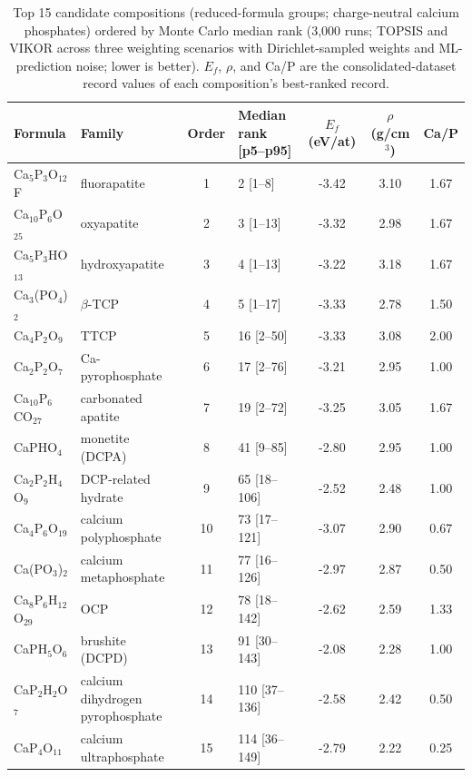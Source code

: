 \documentclass[review,11pt,a4paper]{elsarticle}
\begin{document}
\begin{table}[ht]
\centering\small
\caption{Top 15 candidate compositions (reduced-formula groups; charge-neutral calcium phosphates) ordered by Monte Carlo median rank (3{,}000 runs; TOPSIS and VIKOR across three weighting scenarios with Dirichlet-sampled weights and ML-prediction noise; lower is better). $E_f$, $\rho$, and Ca/P are the consolidated-dataset record values of each composition's best-ranked record.}
\label{tab:top}
\begin{tabular}{llclccc}
\toprule
Formula & Family & Order & Median rank [p5--p95] & $E_f$ (eV/at) & $\rho$ (g/cm$^3$) & Ca/P \\
\midrule
Ca$_5$P$_3$O$_{12}$F & fluorapatite & 1 & 2 [1--8] & -3.42 & 3.10 & 1.67 \\
Ca$_{10}$P$_6$O$_{25}$ & oxyapatite & 2 & 3 [1--13] & -3.32 & 2.98 & 1.67 \\
Ca$_5$P$_3$HO$_{13}$ & hydroxyapatite & 3 & 4 [1--13] & -3.22 & 3.18 & 1.67 \\
Ca$_3$(PO$_4$)$_2$ & $\beta$-TCP & 4 & 5 [1--17] & -3.33 & 2.78 & 1.50 \\
Ca$_4$P$_2$O$_9$ & TTCP & 5 & 16 [2--50] & -3.33 & 3.08 & 2.00 \\
Ca$_2$P$_2$O$_7$ & Ca-pyrophosphate & 6 & 17 [2--76] & -3.21 & 2.95 & 1.00 \\
Ca$_{10}$P$_6$CO$_{27}$ & carbonated apatite & 7 & 19 [2--72] & -3.25 & 3.05 & 1.67 \\
CaPHO$_4$ & monetite (DCPA) & 8 & 41 [9--85] & -2.80 & 2.95 & 1.00 \\
Ca$_2$P$_2$H$_4$O$_9$ & DCP-related hydrate & 9 & 65 [18--106] & -2.52 & 2.48 & 1.00 \\
Ca$_4$P$_6$O$_{19}$ & calcium polyphosphate & 10 & 73 [17--121] & -3.07 & 2.90 & 0.67 \\
Ca(PO$_3$)$_2$ & calcium metaphosphate & 11 & 77 [16--126] & -2.97 & 2.87 & 0.50 \\
Ca$_8$P$_6$H$_{12}$O$_{29}$ & OCP & 12 & 78 [18--142] & -2.62 & 2.59 & 1.33 \\
CaPH$_5$O$_6$ & brushite (DCPD) & 13 & 91 [30--143] & -2.08 & 2.28 & 1.00 \\
CaP$_2$H$_2$O$_7$ & calcium dihydrogen pyrophosphate & 14 & 110 [37--136] & -2.58 & 2.42 & 0.50 \\
CaP$_4$O$_{11}$ & calcium ultraphosphate & 15 & 114 [36--149] & -2.79 & 2.22 & 0.25 \\
\bottomrule
\end{tabular}
\end{table}
\end{document}
